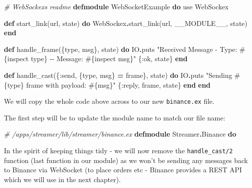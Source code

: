 \documentclass[
  oneside]{book}
\newenvironment{Shaded}{\begin{snugshade}}{\end{snugshade}}
\newcommand{\CommentTok}[1]{\textcolor[rgb]{0.56,0.35,0.01}{\textit{#1}}}
\newcommand{\ConstantTok}[1]{\textcolor[rgb]{0.00,0.00,0.00}{#1}}
\newcommand{\ImportTok}[1]{#1}
\newcommand{\KeywordTok}[1]{\textcolor[rgb]{0.13,0.29,0.53}{\textbf{#1}}}
\newcommand{\NormalTok}[1]{#1}
\newcommand{\OperatorTok}[1]{\textcolor[rgb]{0.81,0.36,0.00}{\textbf{#1}}}
\newcommand{\OtherTok}[1]{\textcolor[rgb]{0.56,0.35,0.01}{#1}}
\newcommand{\StringTok}[1]{\textcolor[rgb]{0.31,0.60,0.02}{#1}}
\newcommand{\VariableTok}[1]{\textcolor[rgb]{0.00,0.00,0.00}{#1}}
\begin{document}
\begin{Shaded}
\begin{Highlighting}[]
\CommentTok{\# WebSockex\textquotesingle{}s readme}
\KeywordTok{defmodule} \ConstantTok{WebSocketExample} \KeywordTok{do}
  \ImportTok{use} \ConstantTok{WebSockex}

  \KeywordTok{def}\NormalTok{ start\_link(url, state) }\KeywordTok{do}
    \ConstantTok{WebSockex}\OperatorTok{.}\NormalTok{start\_link(url, }\ConstantTok{\_\_MODULE\_\_}\NormalTok{, state)}
  \KeywordTok{end}

  \KeywordTok{def}\NormalTok{ handle\_frame(\{type, msg\}, state) }\KeywordTok{do}
    \ConstantTok{IO}\OperatorTok{.}\NormalTok{puts }\StringTok{"Received Message {-} Type: }\OtherTok{\#\{}\NormalTok{inspect type}\OtherTok{\}}\StringTok{ {-}{-} Message: }\OtherTok{\#\{}\NormalTok{inspect msg}\OtherTok{\}}\StringTok{"}
\NormalTok{    \{}\VariableTok{:ok}\NormalTok{, state\}}
  \KeywordTok{end}

  \KeywordTok{def}\NormalTok{ handle\_cast(\{}\VariableTok{:send}\NormalTok{, \{type, msg\} }\OperatorTok{=}\NormalTok{ frame\}, state) }\KeywordTok{do}
    \ConstantTok{IO}\OperatorTok{.}\NormalTok{puts }\StringTok{"Sending }\OtherTok{\#\{}\NormalTok{type}\OtherTok{\}}\StringTok{ frame with payload: }\OtherTok{\#\{}\NormalTok{msg}\OtherTok{\}}\StringTok{"}
\NormalTok{    \{}\VariableTok{:reply}\NormalTok{, frame, state\}}
  \KeywordTok{end}
\KeywordTok{end}
\end{Highlighting}
\end{Shaded}

We will copy the whole code above across to our new \texttt{binance.ex} file.

The first step will be to update the module name to match our file name:

\begin{Shaded}
\begin{Highlighting}[]
\CommentTok{\# /apps/streamer/lib/streamer/binance.ex}
\KeywordTok{defmodule} \ConstantTok{Streamer}\OperatorTok{.}\ConstantTok{Binance} \KeywordTok{do}
\end{Highlighting}
\end{Shaded}

In the spirit of keeping things tidy - we will now remove the \texttt{handle\_cast/2} function (last function in our module) as we won't be sending any messages back to Binance via WebSocket (to place orders etc - Binance provides a REST API which we will use in the next chapter).
\end{document}
